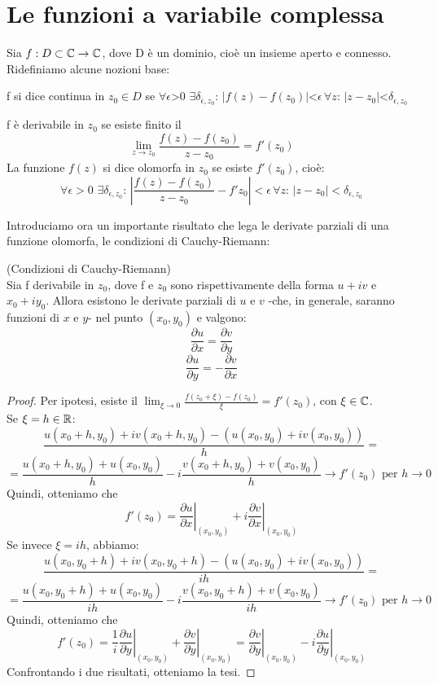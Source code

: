 \chapter{Le funzioni a variabile complessa}

Sia $f:D\subset \mathbb{C} \to \mathbb{C}$, dove D è un dominio, cioè un insieme aperto e connesso. Ridefiniamo alcune nozioni base:
\begin{definizione}
f si dice continua in $z_0 \in D$ se $\forall \epsilon$>0 $\exists \delta_{\epsilon , z_0} : \, |f(z)-f(z_0)|$<$\epsilon \, \forall z: \, |z-z_0|$<$ \delta_{\epsilon , z_0} $
\end{definizione}
\begin{definizione}
f è derivabile in $z_0$ se esiste finito il
$$\lim_{z \to z_0} {\frac{f(z)-f(z_0)}{z-z_0} =f'(z_0)}$$
La funzione $f(z)$ si dice olomorfa in $z_0$ se esiste $f'(z_0)$, cioè:
 $$\forall \epsilon>0 \, \, \exists \delta_{\epsilon , z_0} : \, \left|\frac{f(z)-f(z_0)}{z-z_0} - f'{z_0}\right|< \epsilon \, \forall z: \, |z-z_0|<\delta_{\epsilon , z_0} $$
\end{definizione}

Introduciamo ora un importante risultato che lega le derivate parziali di una funzione olomorfa, le condizioni di Cauchy-Riemann:
\begin{teorema}(Condizioni di Cauchy-Riemann)\\
Sia f derivabile in $z_0$, dove f e $z_0$ sono rispettivamente della forma $u+iv$ e $x_0+iy_0$. Allora esistono le derivate parziali di $u$ e $v$ -che, in generale, saranno  funzioni di $x$ e $y$- nel punto $(x_0,y_0)$ e valgono:
$$\frac{\partial u}{\partial x}=\frac{\partial v}{\partial y}$$
$$\frac{\partial u}{\partial y}=-\frac{\partial v}{\partial x}$$
\end{teorema}


\begin{proof}
Per ipotesi, esiste il $\lim_{\xi \to 0} \frac{f(z_0+ \xi)-f(z_0)}{\xi} =f'(z_0)$, con $\xi \in \mathbb{C}$. \\Se $\xi=h \in \mathbb{R}$:
$$\frac{u(x_0 +h,y_0)+iv(x_0 +h,y_0)- (u(x_0,y_0)+iv(x_0 ,y_0)) }{h}=$$
$$=\frac{u(x_0 +h,y_0)+u(x_0,y_0)}{h} -i\frac{v(x_0+h,y_0)+v(x_0 ,y_0)}{h} \to f'(z_0) \text{ per } h \to 0$$
Quindi, otteniamo che 
$$\left. f'(z_0)=\frac{\partial u}{\partial x} \right|_{(x_0,y_0)} +i  \left. \frac{\partial v}{\partial x} \right|_{(x_0,y_0)}$$
Se invece $\xi=ih$, abbiamo:
$$\frac{u(x_0,y_0+h)+iv(x_0,y_0+h)-(u(x_0,y_0)+iv(x_0 ,y_0))}{ih}=$$
$$=\frac{u(x_0,y_0+h)+u(x_0,y_0)}{ih}-i\frac{v(x_0,y_0+h)+v(x_0 ,y_0)}{ih} \to f'(z_0) \text{ per } h \to 0$$
Quindi, otteniamo che 
$$f'(z_0)=\left. \frac{1}{i} \frac{\partial u}{\partial y} \right|_{(x_0,y_0)} +\left. \frac{\partial v}{\partial y} \right|_{(x_0,y_0)}=\left. \frac{\partial v}{\partial y} \right|_{(x_0,y_0)}-i \left. \frac{\partial u}{\partial y} \right|_{(x_0,y_0)}$$
Confrontando i due risultati, otteniamo la tesi.

\end{proof}

